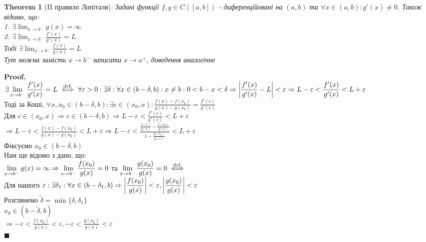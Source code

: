 \documentclass[a4paper, 14pt]{extarticle}
\def\huge{\displaystyle}
\theoremstyle{theoremdd}
\newtheorem{theorem}{Theorem}[subsection]
\theoremstyle{theoremdd}
\theoremstyle{theoremdd}
\theoremstyle{theoremdd}
\theoremstyle{theoremdd}
\theoremstyle{theoremdd}
\theoremstyle{theoremdd}
\theoremstyle{theoremdd}
\newenvironment{pf}{\vspace*{-3mm} \textbf{Proof. \\}}{$\blacksquare$}
\begin{document}
\begin{theorem}[II правило Лопіталя]
Задані функції $f,g \in C([a,b])$ - диференційовані на $(a,b)$ та $\forall x \in (a,b): g'(x) \neq 0$. Також відомо, що:\\
1. $\exists \huge \lim_{x \to b^-} g(x) = \infty$\\
2. $\exists \huge \lim_{x \to b^-} \frac{f'(x)}{g'(x)} = L$\\
Тоді $\exists \huge \lim_{x \to b^-} \frac{f(x)}{g(x)} = L$\\
\textit{Тут можна замість $x \to b^-$ записати $x \to a^+$, доведення аналогічне}
\end{theorem}
\begin{pf}
$\exists \huge \lim_{x \to b^-} \frac{f'(x)}{g'(x)} = L \overset{\textrm{def.}}{\iff} \forall \varepsilon > 0: \exists \delta: \forall x \in (b-\delta,b): x \neq b: 0 < b-x < \delta \\ \Rightarrow \abs{\frac{f'(x)}{g'(x)} - L} < \varepsilon \Rightarrow L-\varepsilon < \frac{f'(x)}{g'(x)} < L+\varepsilon$\\
Тоді за Коші, $\forall x,x_0 \in (b-\delta, b): \exists c \in (x_0,x): \huge \frac{f(x)-f(x_0)}{g(x)-g(x_0)} = \frac{f'(c)}{g'(c)}$\\
Для $\huge c \in (x_0,x) \Rightarrow c \in (b-\delta, b) \Rightarrow L-\varepsilon < \frac{f'(c)}{g'(c)} < L+\varepsilon$\\
$\Rightarrow \huge L-\varepsilon <\frac{f(x)-f(x_0)}{g(x)-g(x_0)} < L+\varepsilon \Rightarrow L-\varepsilon <\frac{\frac{f(x)}{g(x)}-\frac{f(x_0)}{g(x)}}{1 - \frac{g(x_0)}{g(x)}} < L+\varepsilon$\\
Фіксуємо $x_0 \in (b-\delta, b)$\\
Нам ще відомо з дано, що: \\ $\huge \huge \lim_{x \to b^-} g(x) = \infty \Rightarrow \huge \lim_{x \to b^-} \frac{f(x_0)}{g(x)} = 0$ та $\huge \huge \lim_{x \to b^-} \frac{g(x_0)}{g(x)} = 0 \overset{\textrm{def.}}{\iff} $\\
Для нашого $\varepsilon: \exists \delta_1: \forall x \in (b-\delta_1, b) \Rightarrow \huge \abs{\frac{f(x_0)}{g(x)}}<\varepsilon, \abs{\frac{g(x_0)}{g(x)}}<\varepsilon$\\
Розглянемо $\tilde{\delta} = \min\{\delta, \delta_1\}$\\
$x_0 \in (b-\tilde{\delta},b)$\\
$\Rightarrow \huge -\varepsilon<\frac{f(x_0)}{g(x)}<\varepsilon, -\varepsilon<\frac{g(x_0)}{g(x)}<\varepsilon$\\

\end{pf}
\end{document}
